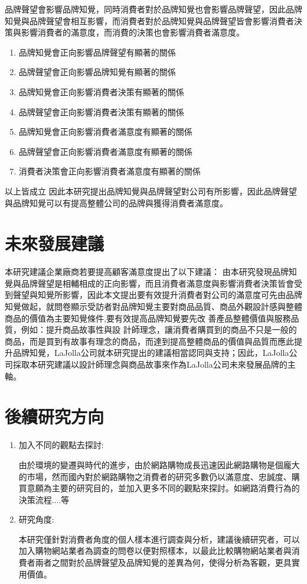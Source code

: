 品牌聲望會影響品牌知覺，同時消費者對於品牌知覺也會影響品牌聲望，因此品牌知覺與品牌聲望會相互影響，而消費者對於品牌知覺與品牌聲望皆會影響消費者決策與影響消費者的滿意度，而消費的決策也會影響消費者滿意度。
\begin{enumerate}
\item 品牌知覺會正向影響品牌聲望有顯著的關係
\item 品牌聲望會正向影響品牌知覺有顯著的關係
\item 品牌知覺會正向影響消費者決策有顯著的關係
\item 品牌聲望會正向影響消費者決策有顯著的關係
\item 品牌知覺會正向影響消費者滿意度有顯著的關係
\item 品牌聲望會正向影響消費者滿意度有顯著的關係
\item 消費者決策會正向影響消費者滿意度有顯著的關係
\end{enumerate}
以上皆成立
因此本研究提出品牌知覺與品牌聲望對公司有所影響，因此品牌聲望與品牌知覺可以有提高整體公司的品牌與獲得消費者滿意度。


\section{未來發展建議}

本研究建議企業廠商若要提高顧客滿意度提出了以下建議：
由本研究發現品牌知覺與品牌聲望是相輔相成的正向影響，而且消費者滿意度與影響消費者決策皆會受到聲望與知覺所影響，因此本文提出要有效提升消費者對公司的滿意度可先由品牌知覺做起，就問卷顯示受訪者對品牌知覺主要對商品品質、商品外觀設計感與整體 商品的價值為主要知覺條件,要有效提高品牌知覺要先改 善產品整體價值與服務品質，例如：提升商品故事性與設 計師理念，讓消費者購買到的商品不只是一般的商品，而是買到有故事有理念的商品，而達到提高整體商品的價值與品質而應此提升品牌知覺，LaJolla公司就本研究提出的建議相當認同與支持；因此，LaJolla公司採取本研究建議以設計師理念與商品故事來作為LaJolla公司未來發展品牌的主軸。
\section{後續研究方向}
\begin{enumerate}
\item 加入不同的觀點去探討:

  由於環境的變遷與時代的進步，由於網路購物成長迅速因此網路購物是個龐大的市場，然而國內對於網路購物之消費者的研究多數仍以滿意度、忠誠度、購買意願為主要的研究目的，並加入更多不同的觀點來探討。如網路消費行為的決策流程....等

\item 研究角度:

  本研究僅針對消費者角度的個人樣本進行調查與分析，建議後續研究者，可以加入購物網站業者為調查的問卷以便對照樣本，以最此比較購物網站業者與消費者兩者之間對於品牌聲望及品牌知覺的差異為何，使得分析為客觀，更具實用價值。
\end{enumerate}
